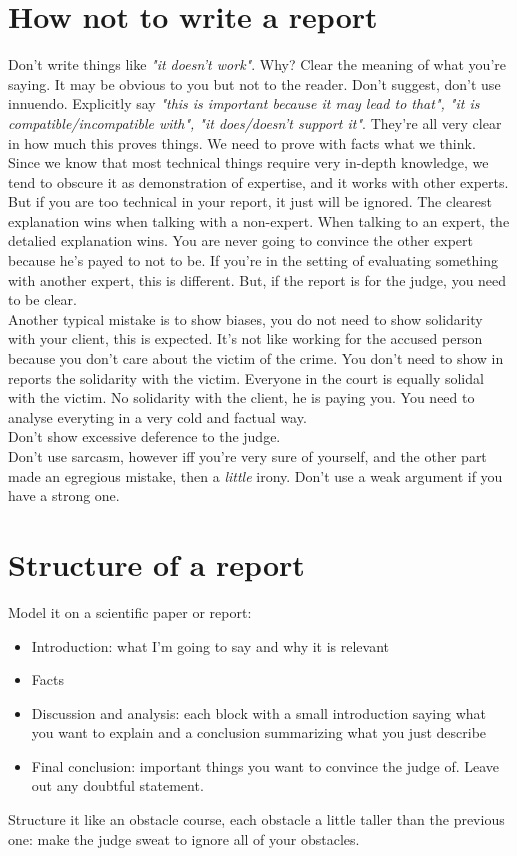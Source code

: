     \section{How not to write a report}
        Don't write things like \textit{"it doesn't work"}. Why? Clear the meaning of what you're saying. It may be obvious to you but not to the reader.
        Don't suggest, don't use innuendo. Explicitly say \textit{"this is important because it may lead to that", "it is compatible/incompatible with", "it does/doesn't support it"}. They're all very clear in how much this proves things. We need to prove with facts what we think.\\
        Since we know that most technical things require very in-depth knowledge, we tend to obscure it as demonstration of expertise, and it works with other experts. But if you are too technical in your report, it just will be ignored. The clearest explanation wins when talking with a non-expert. When talking to an expert, the detalied explanation wins.
        You are never going to convince the other expert because he's payed to not to be.
        If you're in the setting of evaluating something with another expert, this is different. But, if the report is for the judge, you need to be clear.\\
        Another typical mistake is to show biases, you do not need to show solidarity with your client, this is expected. It's not like working for the accused person because you don't care about the victim of the crime. You don't need to show in reports the solidarity with the victim. Everyone in the court is equally solidal with the victim.
        No solidarity with the client, he is paying you. You need to analyse everyting in a very cold and factual way.\\
        Don't show excessive deference to the judge.\\
        Don't use sarcasm, however iff you're very sure of yourself, and the other part made an egregious mistake, then a \textit{little} irony.
        Don't use a weak argument if you have a strong one.
    \section{Structure of a report}
        Model it on a scientific paper or report:
        \begin{itemize}
            \item Introduction: what I'm going to say and why it is relevant
            \item Facts
            \item Discussion and analysis: each block with a small introduction saying what you want to explain and a conclusion summarizing what you just describe
            \item Final conclusion: important things you want to convince the judge of. Leave out any doubtful statement.
        \end{itemize}
        Structure it like an obstacle course, each obstacle a little taller than the previous one: make the judge sweat to ignore all of your obstacles.
